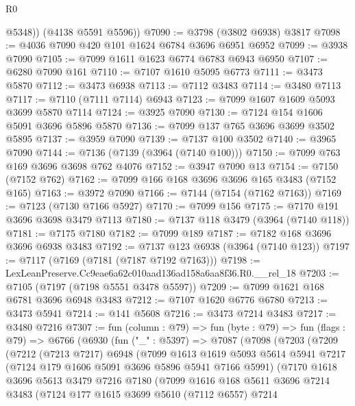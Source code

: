\begin{lexlean}{R0}
\begin{coremodule}
          @5348))
      (@4138 @5591 @5596))
@7090 := @3798 (@3802 @6938) @3817
@7098 := @4036 @7090 @420 @101 @1624 @6784 @3696 @6951 @6952
@7099 := @3938 @7090
@7105 := @7099 @1611 @1623 @6774 @6783 @6943 @6950
@7107 := @6280 @7090 @161
@7110 := @7107 @1610 @5095 @6773
@7111 := @3473 @5870
@7112 := @3473 @6938
@7113 := @7112 @3483
@7114 := @3480 @7113
@7117 := @7110 (@7111 @7114) @6943
@7123 := @7099 @1607 @1609 @5093 @3699 @5870 @7114
@7124 := @3925 @7090
@7130 := @7124 @154 @1606 @5091 @3696 @5896 @5870
@7136 := @7099 @137 @765 @3696 @3699 @3502 @5895
@7137 := @3959 @7090
@7139 := @7137 @100 @3502
@7140 := @3965 @7090
@7144 := @7136 (@7139 (@3964 (@7140 @100)))
@7150 := @7099 @763 @169 @3696 @3698 @762 @4076
@7152 := @3947 @7090 @13
@7154 := @7150 (@7152 @762)
@7162 := @7099 @166 @168 @3696 @3696 @165 @3483 (@7152 @165)
@7163 := @3972 @7090
@7166 := @7144 (@7154 (@7162 @7163))
@7169 := @7123 (@7130 @7166 @5927)
@7170 := @7099 @156
@7175 := @7170 @191 @3696 @3698 @3479 @7113
@7180 := @7137 @118 @3479 (@3964 (@7140 @118))
@7181 := @7175 @7180
@7182 := @7099 @189
@7187 := @7182 @168 @3696 @3696 @6938 @3483
@7192 := @7137 @123 @6938 (@3964 (@7140 @123))
@7197 := @7117 (@7169 (@7181 (@7187 @7192 @7163)))
@7198 := LexLeanPreserve.Cc9eae6a62c010aad136ad158a6aa8f36.R0.__rel_18
@7203 := @7105 (@7197 (@7198 @5551 @3478 @5597))
@7209 := @7099 @1621 @168 @6781 @3696 @6948 @3483
@7212 := @7107 @1620 @6776 @6780
@7213 := @3473 @5941
@7214 := @141 @5608
@7216 := @3473 @7214 @3483
@7217 := @3480 @7216
@7307 := fun (column : @79) =>
  fun (byte : @79) =>
  fun (flags : @79) =>
  @6766
    (@6930
      (fun ("_" : @5397) =>
      @7087
        (@7098
          (@7203
            (@7209
              (@7212
                (@7213 @7217)
                @6948
                (@7099
                  @1613
                  @1619
                  @5093
                  @5614
                  @5941
                  @7217
                  (@7124 @179 @1606 @5091 @3696 @5896 @5941 @7166 @5991)
                  (@7170
                    @1618
                    @3696
                    @5613
                    @3479
                    @7216
                    @7180
                    (@7099
                      @1616
                      @168
                      @5611
                      @3696
                      @7214
                      @3483
                      (@7124
                        @177
                        @1615
                        @3699
                        @5610
                        (@7112 @6557)
                        @7214

\end{coremodule}
\end{lexlean}
